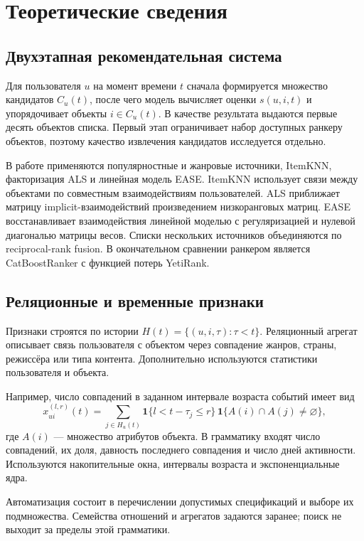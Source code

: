 \documentclass[12pt,a4paper]{article}
\begin{document}
\section{Теоретические сведения}
\subsection{Двухэтапная рекомендательная система}
Для пользователя $u$ на момент времени $t$ сначала формируется множество
кандидатов $C_u(t)$, после чего модель вычисляет оценки $s(u,i,t)$ и
упорядочивает объекты $i\in C_u(t)$. В качестве результата выдаются первые
десять объектов списка. Первый этап ограничивает набор доступных ранкеру
объектов, поэтому качество извлечения кандидатов исследуется отдельно.

В работе применяются популярностные и жанровые источники, ItemKNN,
факторизация ALS и линейная модель EASE. ItemKNN использует связи между
объектами по совместным взаимодействиям пользователей. ALS приближает
матрицу implicit-взаимодействий произведением низкоранговых матриц.
EASE восстанавливает взаимодействия линейной моделью с регуляризацией
и нулевой диагональю матрицы весов. Списки нескольких источников объединяются
по reciprocal-rank fusion. В окончательном сравнении ранкером является
CatBoostRanker с функцией потерь YetiRank.

\subsection{Реляционные и временные признаки}
Признаки строятся по истории $H(t)=\{(u,i,\tau):\tau<t\}$.
Реляционный агрегат описывает связь пользователя с объектом через
совпадение жанров, страны, режиссёра или типа контента. Дополнительно
используются статистики пользователя и объекта.

Например, число совпадений в заданном интервале возраста событий имеет вид
\begin{equation}
x_{ui}^{(l,r)}(t)=\sum_{j\in H_u(t)}
\mathbf{1}\{l<t-\tau_j\le r\}\,
\mathbf{1}\{A(i)\cap A(j)\ne\varnothing\},
\end{equation}
где $A(i)$ — множество атрибутов объекта. В грамматику входят число
совпадений, их доля, давность последнего совпадения и число дней активности.
Используются накопительные окна, интервалы возраста и экспоненциальные ядра.

Автоматизация состоит в перечислении допустимых спецификаций и выборе
их подмножества. Семейства отношений и агрегатов задаются заранее;
поиск не выходит за пределы этой грамматики.
\end{document}
